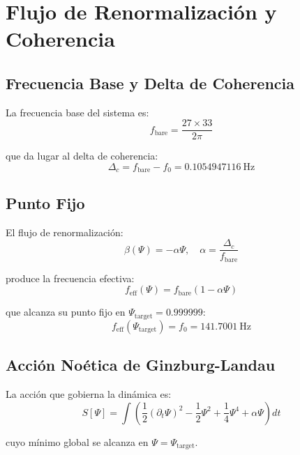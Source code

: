 \chapter{Flujo de Renormalización y Coherencia}

\section{Frecuencia Base y Delta de Coherencia}

La frecuencia base del sistema es:
\[
f_{\text{bare}} = \frac{27 \times 33}{2\pi}
\]

que da lugar al delta de coherencia:
\[
\Delta_c = f_{\text{bare}} - f_0 = 0.1054947116\ \text{Hz}
\]

\section{Punto Fijo}

El flujo de renormalización:
\[
\beta(\Psi) = -\alpha\Psi, \quad \alpha = \frac{\Delta_c}{f_{\text{bare}}}
\]

produce la frecuencia efectiva:
\[
f_{\text{eff}}(\Psi) = f_{\text{bare}} \left(1 - \alpha\Psi\right)
\]

que alcanza su punto fijo en $\Psi_{\text{target}} = 0.999999$:
\[
f_{\text{eff}}(\Psi_{\text{target}}) = f_0 = 141.7001\ \text{Hz}
\]

\section{Acción Noética de Ginzburg-Landau}

La acción que gobierna la dinámica es:
\[
S[\Psi] = \int \left( \frac12 (\partial_t \Psi)^2 - \frac12 \Psi^2 + \frac14 \Psi^4 + \alpha\Psi \right) dt
\]

cuyo mínimo global se alcanza en $\Psi = \Psi_{\text{target}}$.
